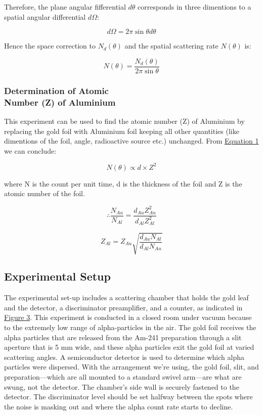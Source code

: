 			Therefore, the plane angular fifferential $d\theta$ corresponds in three dimentions to a spatial angular differential $d\Omega$:

			$$d\Omega = 2\pi\sin\theta d\theta$$

			Hence the space correction to $N_d(\theta)$ and the spatial scattering rate $N(\theta)$ is:

			$$N(\theta) = \frac{N_d(\theta)}{2\pi\sin\theta}$$

		\subsubsection{Determination of Atomic\\ Number (Z) of Aluminium}
			This experiment can be used to find the atomic number (Z) of Aluminium by replacing the gold foil with Aluminium foil keeping all other quantities (like dimentions of the foil, angle, radioactive source etc.) unchanged. From \hyperref[eq:1]{Equation 1} we can conclude:

			$$N(\theta) \propto d\times Z^2$$

			where N is the count per unit time, d is the thickness of the foil and Z is the atomic number of the foil.

			$$\therefore\frac{N_{Au}}{N_{Al}} = \frac{d_{Au}Z^2_{Au}}{d_{Al}Z^2_{Al}}$$

			\begin{equation}
				\label{eq:2}
				Z_{Al} = Z_{Au}\sqrt{\frac{d_{Au}N_{Al}}{d_{Al}N_{Au}}}
			\end{equation}
		
	\subsection{Experimental Setup}

		The experimental set-up includes a scattering chamber that holds the gold leaf and the detector, a discriminator preamplifier, and a counter, as indicated in \hyperref[fig:3]{Figure 3}. This experiment is conducted in a closed room under vacuum because to the extremely low range of alpha-particles in the air. The gold foil receives the alpha particles that are released from the Am-241 preparation through a slit aperture that is 5 mm wide, and these alpha particles exit the gold foil at varied scattering angles. A semiconductor detector is used to determine which alpha particles were dispersed. With the arrangement we're using, the gold foil, slit, and preparation—which are all mounted to a standard swivel arm—are what are swung, not the detector. The chamber's side wall is securely fastened to the detector. The discriminator level should be set halfway between the spots where the noise is masking out and where the alpha count rate starts to decline.

